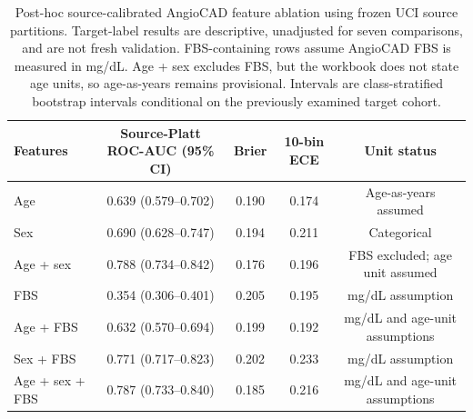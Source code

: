 \begin{table}[t]
\centering
\caption{Post-hoc source-calibrated AngioCAD feature ablation using frozen UCI source partitions. Target-label results are descriptive, unadjusted for seven comparisons, and are not fresh validation. FBS-containing rows assume AngioCAD FBS is measured in mg/dL. Age + sex excludes FBS, but the workbook does not state age units, so age-as-years remains provisional. Intervals are class-stratified bootstrap intervals conditional on the previously examined target cohort.}
\label{tab:angiocad-feature-ablation}
\scriptsize
\begin{tabular}{lcccc}
\toprule
Features & Source-Platt ROC-AUC (95\% CI) & Brier & 10-bin ECE & Unit status \\
\midrule
Age & 0.639 (0.579--0.702) & 0.190 & 0.174 & Age-as-years assumed \\
Sex & 0.690 (0.628--0.747) & 0.194 & 0.211 & Categorical \\
Age + sex & 0.788 (0.734--0.842) & 0.176 & 0.196 & FBS excluded; age unit assumed \\
FBS & 0.354 (0.306--0.401) & 0.205 & 0.195 & mg/dL assumption \\
Age + FBS & 0.632 (0.570--0.694) & 0.199 & 0.192 & mg/dL and age-unit assumptions \\
Sex + FBS & 0.771 (0.717--0.823) & 0.202 & 0.233 & mg/dL assumption \\
Age + sex + FBS & 0.787 (0.733--0.840) & 0.185 & 0.216 & mg/dL and age-unit assumptions \\
\bottomrule
\end{tabular}
\end{table}
